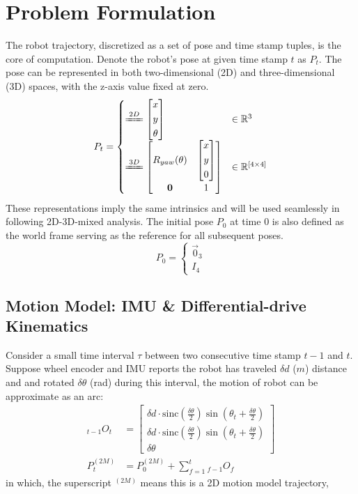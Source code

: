 \documentclass[conference]{IEEEtran}
\begin{document}
\section{Problem Formulation}
The robot trajectory, discretized as a set of pose and time stamp tuples, 
is the core of computation.
Denote the robot's pose at given time stamp \(t\) as \(P_t\).
The pose can be represented in both two-dimensional (2D) and three-dimensional (3D) spaces, 
with the z-axis value fixed at zero. 
$$
P_{t} = \begin{cases}
    \xlongequal{2D} \left[ \begin{gathered}x\\ y\\ \theta \end{gathered} \right] & \in \mathbb{R}^{3} \\ 
    \xlongequal{3D} \left[ \begin{matrix}R_{yaw}(\theta )&\left[ \begin{gathered}x\\ y\\0\end{gathered} \right]  \\ \mathbf{0}&1\end{matrix} \right] & \in \mathbb{R}^{[4\times 4]}
\end{cases} 
$$
These representations imply the same intrinsics 
and will be used seamlessly in following 2D-3D-mixed analysis.
The initial pose $P_0$ at time 0 is also defined as the world frame
serving as the reference for all subsequent poses.
$$P_{0}=\begin{cases}\vec{0}_{3}\\ I_{4}\end{cases} $$

\subsection{Motion Model: IMU \& Differential-drive Kinematics}
Consider a small time interval $\tau$ between two consecutive time stamp $t-1$ and $t$.
Suppose wheel encoder and IMU reports the robot has traveled $\delta d$ ($m$) distance and 
and rotated $\delta \theta$ (rad) during this interval,
the motion of robot can be approximate as an arc:
$$
\begin{aligned}
    {}_{t-1}O_{t}
        & =\left[ \begin{gathered}\delta d\cdot \mathrm{sinc} \left( \frac{\delta \theta }{2} \right)  \sin \left( \theta_{t} +\frac{\delta \theta }{2} \right)  \\ \delta d\cdot \mathrm{sinc} \left( \frac{\delta \theta }{2} \right)  \sin \left( \theta_{t} +\frac{\delta \theta }{2} \right)  \\ \delta \theta \end{gathered} \right] \\
    P_{t}^{(2M)}
    &=P_{0}^{(2M)} + \sum_{f=1}^{t} {}_{f-1}O_{f}
\end{aligned} 
$$
in which, the superscript $^{(2M)}$ means this is a 2D motion model trajectory,
\end{document}
